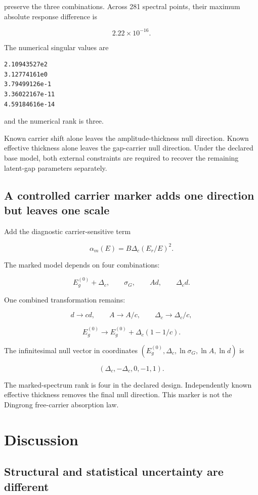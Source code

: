 \documentclass[12pt]{article}
\begin{document}
preserve the three combinations. Across 281 spectral points, their maximum absolute response difference is

\[
2.22\times10^{-16}.
\]

The numerical singular values are

\begin{verbatim}
2.10943527e2
3.12774161e0
3.79499126e-1
3.36022167e-11
4.59184616e-14
\end{verbatim}

and the numerical rank is three.

Known carrier shift alone leaves the amplitude-thickness null direction. Known effective thickness alone leaves the gap-carrier null direction. Under the declared base model, both external constraints are required to recover the remaining latent-gap parameters separately.

\subsection{A controlled carrier marker adds one direction but leaves one scale}

Add the diagnostic carrier-sensitive term

\[
\alpha_m(E)=B\Delta_c(E_r/E)^2.
\]

The marked model depends on four combinations:

\[
E_g^{(0)}+\Delta_c,
\qquad
\sigma_G,
\qquad
Ad,
\qquad
\Delta_cd.
\]

One combined transformation remains:

\[
d\rightarrow cd,
\qquad
A\rightarrow A/c,
\qquad
\Delta_c\rightarrow\Delta_c/c,
\]

\[
E_g^{(0)}
\rightarrow
E_g^{(0)}+\Delta_c(1-1/c).
\]

The infinitesimal null vector in coordinates $(E_g^{(0)},\Delta_c,\ln\sigma_G,\ln A,\ln d)$ is

\[
(\Delta_c,-\Delta_c,0,-1,1).
\]

The marked-spectrum rank is four in the declared design. Independently known effective thickness removes the final null direction. This marker is not the Dingrong free-carrier absorption law.

\section{Discussion}

\subsection{Structural and statistical uncertainty are different}
\end{document}
